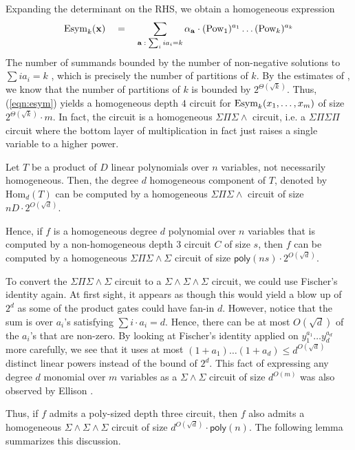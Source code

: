 \documentclass{beatcs}
\newcommand{\poly}{\mathsf{poly}}
\newcommand{\SPSP}{\Sigma\Pi\Sigma\Pi}
\newcommand{\SPSE}{\Sigma\Pi\Sigma\wedge}
\begin{document}
Expanding the determinant on the RHS, we obtain a homogeneous expression
\begin{equation}\label{eqn:esym}
\mathrm{Esym}_k(\mathbf{x}) \quad = \quad \sum_{\mathbf{a}\;:\; \sum_i ia_i = k} \alpha_{\mathbf{a}} \cdot (\mathrm{Pow}_1)^{a_1}\dots (\mathrm{Pow}_k)^{a_k}
\end{equation}
The number of summands bounded by the number of non-negative solutions to $\sum i a_i = k$ , which is precisely the number of partitions of $k$. By the estimates of \cite{hr18}, we know that the number of partitions of $k$ is bounded by $2^{\Theta(\sqrt{k})}$. Thus, (\ref{eqn:esym}) yields a homogeneous depth $4$ circuit for $\mathrm{Esym}_k(x_1,\dots, x_m)$ of size $2^{\Theta(\sqrt{k})} \cdot m$. In fact, the circuit is a homogeneous $\SPSE$ circuit, i.e. a $\SPSP$ circuit where the bottom layer of multiplication in fact just raises a single variable to a higher power. 

\begin{corollary}\label{cor:d3-d5}
Let $T$ be a product of $D$ linear polynomials over $n$ variables, not necessarily homogeneous. Then, the degree $d$ homogeneous component of $T$, denoted by $\mathrm{Hom}_d(T)$ can be computed by a homogeneous $\SPSE$ circuit of size $nD\cdot 2^{O(\sqrt{d})}$. 

Hence, if $f$ is a homogeneous degree $d$ polynomial over $n$ variables that is computed by a non-homogeneous depth $3$ circuit $C$ of size $s$, then $f$ can be computed by a homogeneous $\Sigma\Pi\Sigma\!\wedge\!\Sigma$ circuit of size $\poly(ns) \cdot 2^{O(\sqrt{d})}$. 
\end{corollary}

To convert the $\Sigma\Pi\Sigma\!\wedge\!\Sigma$ circuit to a $\Sigma\!\wedge\!\Sigma\!\wedge\!\Sigma$ circuit, we could use Fischer's identity again. At first sight, it appears as though this would yield a blow up of $2^d$ as some of the product gates could have fan-in $d$. However, notice that the sum is over $a_i$'s satisfying $\sum i\cdot a_i = d$. Hence, there can be at most $O(\sqrt{d})$ of the $a_i$'s that are non-zero. By looking at Fischer's identity applied on $y_1^{a_1}\dots y_{d}^{a_d}$ more carefully, we see that it uses at most $(1+a_1)\dots (1+a_d) \leq d^{O(\sqrt{d})}$ distinct linear powers instead of the \naive bound of $2^{d}$. This fact of expressing any degree $d$ monomial over $m$ variables as a $\Sigma\!\wedge\!\Sigma$ circuit of size $d^{O(m)}$ was also observed by Ellison \cite{ellison}. 

Thus, if $f$ admits a poly-sized depth three circuit, then $f$ also admits a homogeneous $\Sigma\!\wedge\!\Sigma\!\wedge\!\Sigma$ circuit of size $d^{O(\sqrt{d})} \cdot \poly(n)$. The following lemma summarizes this discussion. 
\end{document}
